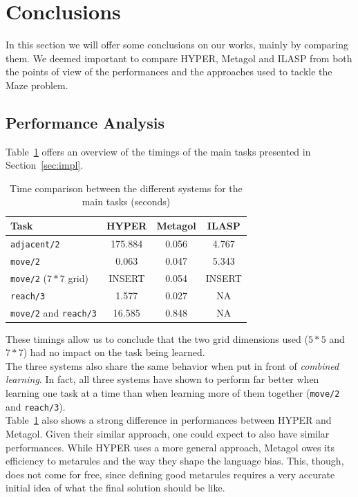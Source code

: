 \section{Conclusions}\label{sec:perf}
In this section we will offer some conclusions on our works, mainly by comparing them. We deemed important
to compare HYPER, Metagol and ILASP from both the points of view of the performances and the approaches used
to tackle the Maze problem.

\subsection{Performance Analysis}
Table~\ref{tab:prf_cmp} offers an overview of the timings of the main tasks presented in Section~\ref{sec:impl}.
{
\begin{center}
    \begin{table}[h]
    \centering
    \begin{tabular}{ |l|c|c|c| } 
        \hline
        Task & \textbf{HYPER} & \textbf{Metagol} & \textbf{ILASP} \\ \hline
        \texttt{adjacent/2} & 175.884 & 0.056 & 4.767 \\ 
        \texttt{move/2} & 0.063 & 0.047 & 5.343 \\ 
        \texttt{move/2} (\(7*7\) grid) & INSERT & 0.054 & INSERT \\ 
        \texttt{reach/3} & 1.577 & 0.027 & NA \\ 
        \texttt{move/2} and \texttt{reach/3} & 16.585 & 0.848 & NA \\ 
        \hline
    \end{tabular}
    \caption{\label{tab:prf_cmp}Time comparison between the different systems for the main tasks (seconds)}
\end{table}
\end{center}
}
These timings allow us to conclude that the two grid dimensions used (\(5*5\) and \(7*7\)) had no impact on the task being learned.\\
The three systems also share the same behavior when put in front of \emph{combined learning}. In fact, all three systems have shown to perform 
far better when learning one task at a time than when learning more of them together (\texttt{move/2} and \texttt{reach/3}).\\
Table~\ref{tab:prf_cmp} also shows a strong difference in performances between HYPER and Metagol. Given their similar approach, one could expect
to also have similar performances. While HYPER uses a more general approach, Metagol owes its efficiency to metarules and the way they shape the language bias. This, though, does not come
for free, since defining good metarules requires a very accurate initial idea of what the final solution should be like.\\

